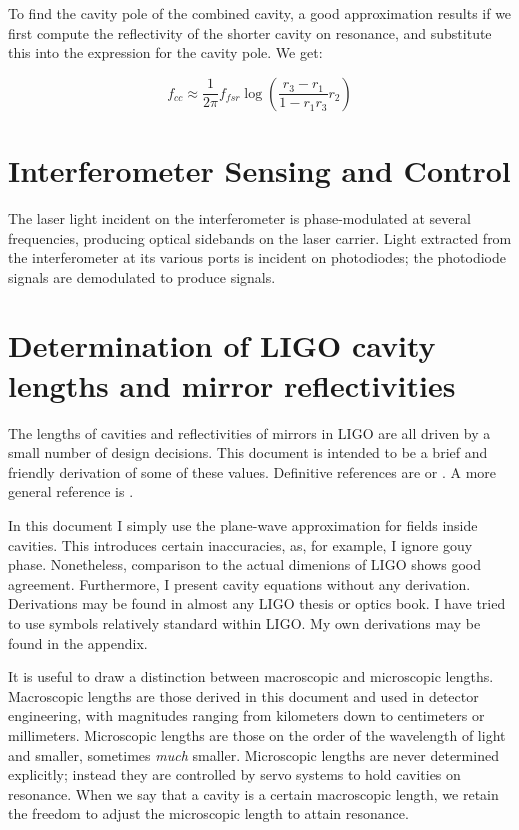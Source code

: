 To find the cavity pole of the combined cavity, a good approximation
results if we first compute the reflectivity of the shorter cavity on
resonance, and substitute this into the expression for the cavity pole.
We get:

\begin{equation}
f_{cc} \approx \frac{1}{2\pi} f_{fsr} \log \left(\frac{r_3 - r_1}{1 - r_1 r_3} r_2\right)
\end{equation}



\section{Interferometer Sensing and Control}

The laser light incident on the interferometer is phase-modulated at
several frequencies, producing optical sidebands on the laser carrier.
Light extracted from the interferometer at its various ports is
incident on photodiodes; the photodiode signals are demodulated to
produce signals.

\cite{Fritschel2001Readout}



\section{Determination of LIGO cavity lengths and mirror reflectivities}

The lengths of cavities and reflectivities of mirrors in LIGO are
all driven by a small number of design decisions. This document is
intended to be a brief and friendly derivation of some of these values.
Definitive references are \cite{LigoFreqResponse97} or \cite{Fritschel2001Readout}.
A more general reference is \cite{S5InstrumentPaper}.

In this document I simply use the plane-wave approximation for fields
inside cavities. This introduces certain inaccuracies, as, for example,
I ignore gouy phase. Nonetheless, comparison to the actual dimenions
of LIGO shows good agreement. Furthermore, I present cavity equations
without any derivation. Derivations may be found in almost any LIGO
thesis or optics book. I have tried to use symbols relatively standard
within LIGO. My own derivations may be found in the appendix.

It is useful to draw a distinction between macroscopic and microscopic
lengths. Macroscopic lengths are those derived in this document and
used in detector engineering, with magnitudes ranging from kilometers
down to centimeters or millimeters. Microscopic lengths are those
on the order of the wavelength of light and smaller, sometimes \emph{much}
smaller. Microscopic lengths are never determined explicitly; instead
they are controlled by servo systems to hold cavities on resonance.
When we say that a cavity is a certain macroscopic length, we retain
the freedom to adjust the microscopic length to attain resonance.


